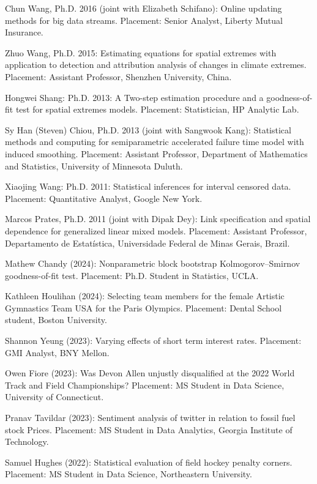 \documentclass[Statistics]{vita}
\begin{document}
\begin{vita}
\begin{Students}
\begin{Ph.D.}
    \item Chun Wang, Ph.D. 2016 (joint with Elizabeth Schifano): Online updating methods for big data streams. Placement: Senior Analyst, Liberty Mutual Insurance.
    \item Zhuo Wang, Ph.D. 2015: Estimating equations for spatial extremes with application to detection and attribution analysis of changes in climate extremes. Placement: Assistant Professor, Shenzhen University, China.
    \item Hongwei Shang: Ph.D. 2013: A Two-step estimation procedure and a goodness-of-fit test for spatial extremes models. Placement: Statistician, HP Analytic Lab.
    \item Sy Han (Steven) Chiou, Ph.D. 2013 (joint with Sangwook Kang): Statistical methods and computing for semiparametric accelerated failure time model with induced smoothing. Placement: Assistant Professor, Department of Mathematics and Statistics, University of Minnesota Duluth.
    \item Xiaojing Wang: Ph.D. 2011: Statistical inferences for interval censored data. Placement: Quantitative Analyst, Google New York.
    \item Marcos Prates, Ph.D. 2011 (joint with Dipak Dey): Link specification and spatial dependence for generalized linear mixed models. Placement: Assistant Professor, Departamento de Estat\'{i}stica, Universidade Federal de Minas Gerais, Brazil.
    \end{Ph.D.}
    \begin{UndergraduateHonor}
    \item Mathew Chandy (2024): Nonparametric block bootstrap Kolmogorov--Smirnov goodness-of-fit test. Placement: Ph.D. Student in Statistics, UCLA.
    \item Kathleen Houlihan (2024): Selecting team members for the female Artistic Gymnastics Team USA for the Paris Olympics. Placement: Dental School student, Boston University.
    \item Shannon Yeung (2023): Varying effects of short term interest rates. Placement: GMI Analyst, BNY Mellon.
    \item Owen Fiore (2023): Was Devon Allen unjustly disqualified at the 2022 World Track and Field Championships? Placement: MS Student in Data Science, University of Connecticut.
    \item Pranav Tavildar (2023): Sentiment analysis of twitter in relation to fossil fuel stock Prices. Placement: MS Student in Data Analytics, Georgia Institute of Technology.
    \item Samuel Hughes (2022): Statistical evaluation of field hockey penalty corners. Placement: MS Student in Data Science, Northeastern University.

\end{UndergraduateHonor}
\end{Students}
\end{vita}
\end{document}
